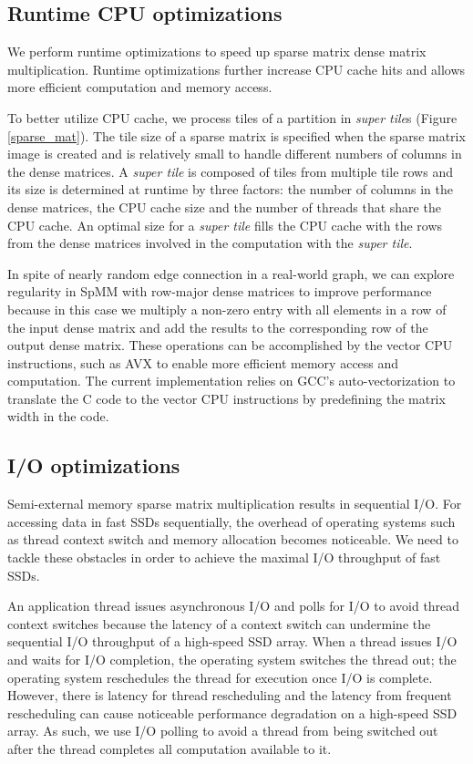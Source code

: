 \subsection{Runtime CPU optimizations} \label{sec:cpu}
We perform runtime optimizations to speed up sparse matrix
dense matrix multiplication. Runtime optimizations further increase
CPU cache hits and allows more efficient computation and memory access.

To better utilize CPU cache, we process tiles of a partition in
\textit{super tile}s (Figure \ref{sparse_mat}). The tile size of a sparse
matrix is specified when the sparse matrix image is created and is relatively
small to handle different numbers of columns in the dense matrices.
A \textit{super tile} is composed of tiles from multiple tile rows and its
size is determined at runtime by three factors: the number of columns
in the dense matrices, the CPU cache size and the number of threads that
share the CPU cache. An optimal size for a \textit{super tile} fills
the CPU cache with the rows from the dense matrices involved in
the computation with the \textit{super tile}.

In spite of nearly random edge connection in a real-world graph, we can explore
regularity in SpMM with row-major dense matrices to improve performance because
in this case we multiply a non-zero entry with all elements in a row of
the input dense matrix
and add the results to the corresponding row of the output dense matrix.
These operations can be accomplished by the vector CPU instructions, such as
AVX \cite{avx} to enable more efficient memory access and computation.
The current implementation relies on GCC's auto-vectorization
to translate the C code to the vector CPU instructions by predefining the matrix
width in the code.

\newpage

\subsection{I/O optimizations}
Semi-external memory sparse matrix multiplication results in sequential I/O.
For accessing data in fast SSDs sequentially, the overhead of operating systems
such as thread context switch and memory allocation becomes noticeable.
We need to tackle these obstacles in order to achieve the maximal I/O
throughput of fast SSDs.

An application thread issues asynchronous I/O and polls for I/O to avoid thread
context switches because the latency of a context switch can undermine
the sequential I/O throughput of a high-speed SSD array. When a thread issues
I/O and waits for I/O completion, the operating system switches the thread
out; the operating system reschedules the thread for execution once I/O is
complete. However, there is latency for thread rescheduling and the latency
from frequent rescheduling can cause noticeable performance degradation
on a high-speed SSD array. As such, we use I/O polling to avoid a thread from
being switched out after the thread completes all computation available to it.

